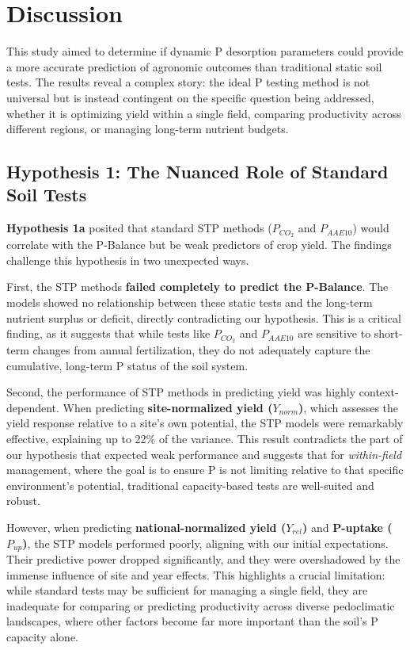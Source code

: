 \documentclass[
  a4paper,
]{article}
\begin{document}
\section{Discussion}\label{discussion}

This study aimed to determine if dynamic P desorption parameters could
provide a more accurate prediction of agronomic outcomes than
traditional static soil tests. The results reveal a complex story: the
ideal P testing method is not universal but is instead contingent on the
specific question being addressed, whether it is optimizing yield within
a single field, comparing productivity across different regions, or
managing long-term nutrient budgets.

\subsection{Hypothesis 1: The Nuanced Role of Standard Soil
Tests}\label{hypothesis-1-the-nuanced-role-of-standard-soil-tests}

\textbf{Hypothesis 1a} posited that standard STP methods (\(P_{CO_2}\)
and \(P_{AAE10}\)) would correlate with the P-Balance but be weak
predictors of crop yield. The findings challenge this hypothesis in two
unexpected ways.

First, the STP methods \textbf{failed completely to predict the
P-Balance}. The models showed no relationship between these static tests
and the long-term nutrient surplus or deficit, directly contradicting
our hypothesis. This is a critical finding, as it suggests that while
tests like \(P_{CO_2}\) and \(P_{AAE10}\) are sensitive to short-term
changes from annual fertilization, they do not adequately capture the
cumulative, long-term P status of the soil system.

Second, the performance of STP methods in predicting yield was highly
context-dependent. When predicting \textbf{site-normalized yield
(\(Y_{norm}\))}, which assesses the yield response relative to a site's
own potential, the STP models were remarkably effective, explaining up
to 22\% of the variance. This result contradicts the part of our
hypothesis that expected weak performance and suggests that for
\emph{within-field} management, where the goal is to ensure P is not
limiting relative to that specific environment's potential, traditional
capacity-based tests are well-suited and robust.

However, when predicting \textbf{national-normalized yield
(\(Y_{rel}\))} and \textbf{P-uptake (\(P_{up}\))}, the STP models
performed poorly, aligning with our initial expectations. Their
predictive power dropped significantly, and they were overshadowed by
the immense influence of site and year effects. This highlights a
crucial limitation: while standard tests may be sufficient for managing
a single field, they are inadequate for comparing or predicting
productivity across diverse pedoclimatic landscapes, where other factors
become far more important than the soil's P capacity alone.
\end{document}
